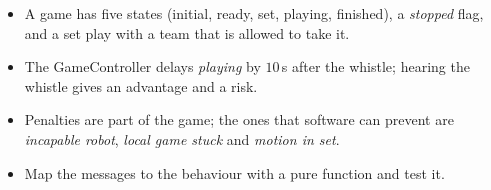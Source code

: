 \begin{keyidea}[Summary]
\begin{itemize}[nosep]
 \item A game has five states (initial, ready, set, playing, finished), a \emph{stopped} flag, and a set play with a team that is allowed to take it.
 \item The GameController delays \emph{playing} by $10$\,s after the whistle; hearing the whistle gives an advantage and a risk.
 \item Penalties are part of the game; the ones that software can prevent are \emph{incapable robot}, \emph{local game stuck} and \emph{motion in set}.
 \item Map the messages to the behaviour with a pure function and test it.
\end{itemize}
\end{keyidea}

